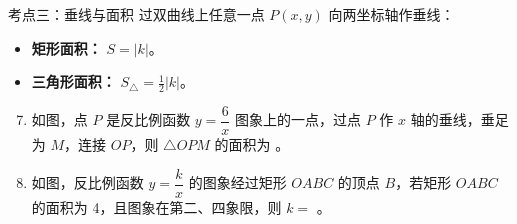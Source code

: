 \documentclass[12pt, a4paper]{article}
\begin{document}
\begin{conceptbox}{考点三：垂线与面积}
    过双曲线上任意一点 $P(x, y)$ 向两坐标轴作垂线：
    \begin{itemize}
        \item \textbf{矩形面积：} $S = |k|$。
        \item \textbf{三角形面积：} $S_{\triangle} = \frac{1}{2}|k|$。
    \end{itemize}
\end{conceptbox}

\begin{examplebox}
    \begin{enumerate}[label=\textbf{例\arabic*.}]
        \setcounter{enumi}{6}
        \item 如图，点 $P$ 是反比例函数 $y = \dfrac{6}{x}$ 图象上的一点，过点 $P$ 作 $x$ 轴的垂线，垂足为 $M$，连接 $OP$，则 $\triangle OPM$ 的面积为 \underline{\hspace{2cm}}。
        
        \item 如图，反比例函数 $y = \dfrac{k}{x}$ 的图象经过矩形 $OABC$ 的顶点 $B$，若矩形 $OABC$ 的面积为 4，且图象在第二、四象限，则 $k = $ \underline{\hspace{2cm}}。
        
    \end{enumerate}
\end{examplebox}
\end{document}

